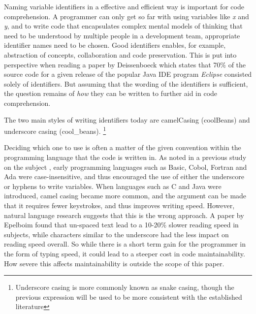 \iffalse
\begin{itemize}
	\item Identifier names are important
	\item We have two identifier styles
	\item Some history 
	\item Two other studies
	\item Some background on them
	\item Reference all terms introduced
\end{itemize}
\fi

Naming variable identifiers in a effective and efficient way is important for code comprehension. A programmer can only get so far with using variables like \textit{x} and \textit{y}, and to write code that encapsulates complex mental models of thinking that need to be understood by multiple people in a development team, appropriate identifier names need to be chosen. Good identifiers enables, for example, abstraction of concepts, collaboration and code preservation. This is put into perspective when reading a paper by Deissenboeck \etal \cite{Concise-Naming} which states that 70\% of the source code for a given release of the popular Java IDE program \textit{Eclipse} consisted solely of identifiers. But assuming that the wording of the identifiers is sufficient, the question remains of \textit{how} they can be written to further aid in code comprehension.

The two main styles of writing identifiers today are camelCasing (\eg coolBeans) and underscore casing (\eg cool\_beans). \footnote{Underscore casing is more commonly known as snake casing, though the previous expression will be used to be more consistent with the established literature}

Deciding which one to use is often a matter of the given convention within the programming language that the code is written in. As noted in a previous study on the subject \cite{eye-tracking-study}, early programming languages such as Basic, Cobol, Fortran and Ada were case-insensitive, and thus encouraged the use of either the underscore or hyphens to write variables. When languages such as C and Java were introduced, camel casing became more common, and the argument can be made that it requires fewer keystrokes, and thus improves writing speed. However, natural language research suggests that this is the wrong approach. A paper by Epelboim \etal \cite{Fillers-in-text} found that un-spaced text lead to a 10-20\% slower reading speed in subjects, while characters similar to the underscore had the less impact on reading speed overall. So while there is a short term gain for the programmer in the form of typing speed, it could lead to a steeper cost in code maintainability. How severe this affects maintainability is outside the scope of this paper.

